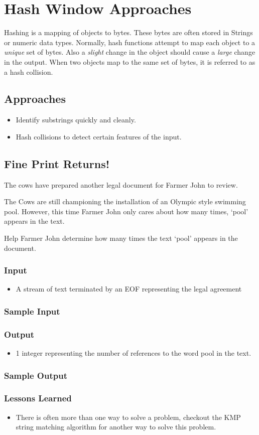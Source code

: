 \section{Hash Window Approaches}
Hashing is a mapping of objects to bytes.
These bytes are often stored in Strings or numeric data types.
Normally, hash functions attempt to map each object to a \textit{unique} set of bytes.
Also a \textit{slight} change in the object should cause a \textit{large} change in the output.
When two objects map to the same set of bytes, it is referred to as a hash collision.

\subsection{Approaches}
\begin{itemize}
	\item Identify substrings quickly and cleanly.
	\item Hash collisions to detect certain features of the input.
\end{itemize}

\subsection{Fine Print Returns!}
The cows have prepared another legal document for Farmer John to review.

The Cows are still championing the installation of an Olympic style swimming pool.
However, this time Farmer John only cares about how many times, `pool' appears in the text.

Help Farmer John determine how many times the text `pool' appears in the document.

\subsubsection{Input}
\begin{itemize}
	\item A stream of text terminated by an EOF representing the legal agreement
\end{itemize}

\subsubsection{Sample Input}

\subsubsection{Output}
\begin{itemize}
	\item 1 integer representing the number of references to the word pool in the text.
\end{itemize}

\subsubsection{Sample Output}

\subsubsection{Lessons Learned}
\begin{itemize}
	\item There is often more than one way to solve a problem,  checkout the KMP string matching algorithm for another way to solve this problem.
\end{itemize}
